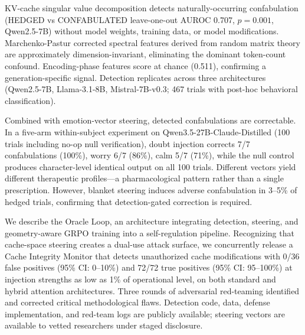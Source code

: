 KV-cache singular value decomposition detects naturally-occurring
confabulation (HEDGED vs CONFABULATED leave-one-out AUROC 0.707,
$p=0.001$, Qwen2.5-7B) without model weights, training data, or model
modifications. Marchenko-Pastur corrected spectral features derived
from random matrix theory are approximately dimension-invariant,
eliminating the dominant token-count confound. Encoding-phase features
score at chance (0.511), confirming a generation-specific signal.
Detection replicates across three architectures (Qwen2.5-7B,
Llama-3.1-8B, Mistral-7B-v0.3; 467 trials with post-hoc behavioral
classification).

Combined with emotion-vector steering, detected confabulations are
correctable. In a five-arm within-subject experiment on
Qwen3.5-27B-Claude-Distilled (100 trials including no-op null
verification), doubt injection corrects 7/7 confabulations (100\%),
worry 6/7 (86\%), calm 5/7 (71\%), while the null control produces
character-level identical output on all 100 trials. Different vectors
yield different therapeutic profiles---a pharmacological pattern rather
than a single prescription. However, blanket steering induces adverse
confabulation in 3--5\% of hedged trials, confirming that
detection-gated correction is required.

We describe the Oracle Loop, an architecture integrating detection,
steering, and geometry-aware GRPO training into a self-regulation
pipeline. Recognizing that cache-space steering creates a dual-use
attack surface, we concurrently release a Cache Integrity Monitor that
detects unauthorized cache modifications with 0/36 false positives
(95\% CI: 0--10\%) and 72/72 true positives (95\% CI: 95--100\%) at
injection strengths as low as 1\% of operational level, on both
standard and hybrid attention architectures. Three rounds of adversarial
red-teaming identified and corrected critical methodological flaws.
Detection code, data, defense implementation, and red-team logs are
publicly available; steering vectors are available to vetted researchers
under staged disclosure.
